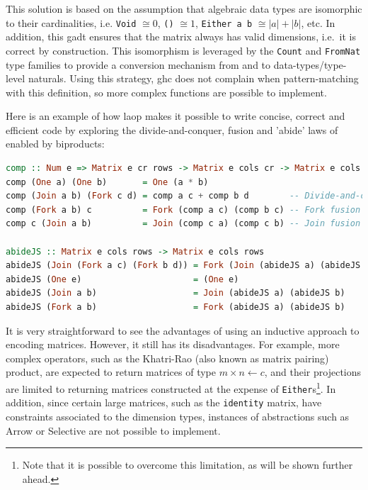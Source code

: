 \documentclass[
  oneside,
  11pt, a4paper,
  footinclude=true,
  headinclude=true,
  cleardoublepage=empty
]{scrbook}
\theoremstyle{definition}
\theoremstyle{definition}
\begin{document}
	    This solution is based on the assumption that algebraic data types are isomorphic to their cardinalities, i.e. \texttt{Void} $ \cong 0$, \texttt{()} $\cong 1$, \texttt{Either a b} $\cong |a| + |b|$, etc. In addition, this \gls{gadt} ensures that the matrix always has valid dimensions, i.e.\ it is correct by construction. This isomorphism is leveraged by the \texttt{Count} and \texttt{FromNat} type families to provide a conversion mechanism from and to data-types/type-level naturals. Using this strategy, \gls{ghc} does not complain when pattern-matching with this definition, so more complex functions are possible to implement.
	    
	    Here is an example of how \gls{laop} makes it possible to write concise, correct and efficient code by exploring the divide-and-conquer, fusion and 'abide' laws of enabled by biproducts:
	    
        \begin{lstlisting}[language=Haskell, caption={Matrix composition and abiding functions},captionpos=b]
comp :: Num e => Matrix e cr rows -> Matrix e cols cr -> Matrix e cols rows
comp (One a) (One b)       = One (a * b)
comp (Join a b) (Fork c d) = comp a c + comp b d        -- Divide-and-conquer law
comp (Fork a b) c          = Fork (comp a c) (comp b c) -- Fork fusion law
comp c (Join a b)          = Join (comp c a) (comp c b) -- Join fusion law
        
abideJS :: Matrix e cols rows -> Matrix e cols rows
abideJS (Join (Fork a c) (Fork b d)) = Fork (Join (abideJS a) (abideJS b)) (Join (abideJS c) (abideJS d)) -- Join-Fork abide law
abideJS (One e)                      = (One e)
abideJS (Join a b)                   = Join (abideJS a) (abideJS b)
abideJS (Fork a b)                   = Fork (abideJS a) (abideJS b)
        \end{lstlisting}{}
        
        It is very straightforward to see the advantages of using an inductive approach to encoding matrices. However, it still has its disadvantages. For example, more complex operators, such as the Khatri-Rao (also known as matrix pairing) product, are expected to return matrices of type $m \times n \leftarrow c$, and their projections are limited to returning matrices constructed at the expense of \texttt{Either}s\footnote{Note that it is possible to overcome this limitation, as will be shown further ahead.}. In addition, since certain large matrices, such as the \texttt{identity} matrix, have constraints associated to the dimension types, instances of abstractions such as Arrow or Selective are not possible to implement.
        
\end{document}
